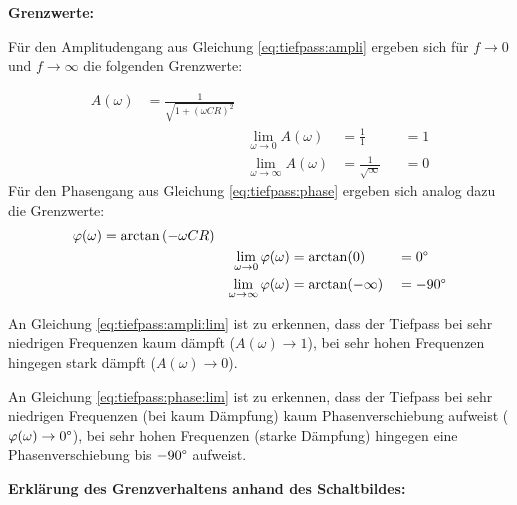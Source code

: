 \begin{frame}[t]
{    \textbf{Grenzwerte:}

    Für den Amplitudengang aus Gleichung \ref{eq:tiefpass:ampli} ergeben sich
    für $f \rightarrow 0$ und $f \rightarrow \infty$ die folgenden Grenzwerte:

    \begin{align}
        &&A(\omega) &=\frac{1}{\sqrt{1 + (\omega CR)^2}}    &                                           &                           &   &    &&\nonumber\\
        &&          &                                       &   \lim_{\omega \rightarrow 0}A(\omega)    &=\frac{1}{1}               &   &=1  &&\label{eq:tiefpass:ampli:lim}\\
        &&          &                                       &   \lim_{\omega \rightarrow \infty}A(\omega)&=\frac{1}{\sqrt{\infty}}  &   &=0  &&\nonumber
    \end{align}
    Für den Phasengang aus Gleichung \ref{eq:tiefpass:phase} ergeben sich analog dazu die Grenzwerte:
    \begin{align}
        &&\varphi(\omega)   &=\arctan\left(-\omega CR\right)&                                                   &                   &   &           &&\nonumber\\
        &&                  &                               &   \lim_{\omega \rightarrow 0}\varphi(\omega)      &=\arctan(0)        &   &=0\degree  &&\label{eq:tiefpass:phase:lim}\\
        &&                  &                               &   \lim_{\omega \rightarrow \infty}\varphi(\omega) &=\arctan(-\infty)  &   &=-90\degree&&\nonumber
    \end{align}

    An Gleichung \ref{eq:tiefpass:ampli:lim} ist zu erkennen, dass der Tiefpass bei sehr niedrigen Frequenzen kaum dämpft ($A(\omega) \rightarrow 1$), 
    bei sehr hohen Frequenzen hingegen stark dämpft ($A(\omega) \rightarrow 0$). 
    
    An Gleichung \ref{eq:tiefpass:phase:lim} ist zu erkennen, dass der Tiefpass bei sehr niedrigen Frequenzen (bei kaum Dämpfung) kaum Phasenverschiebung aufweist ($\varphi(\omega) \rightarrow 0\degree$),
    bei sehr hohen Frequenzen (starke Dämpfung) hingegen eine Phasenverschiebung bis $-90\degree$ aufweist. 

    \textbf{Erklärung des Grenzverhaltens anhand des Schaltbildes:}

}
\end{frame}
